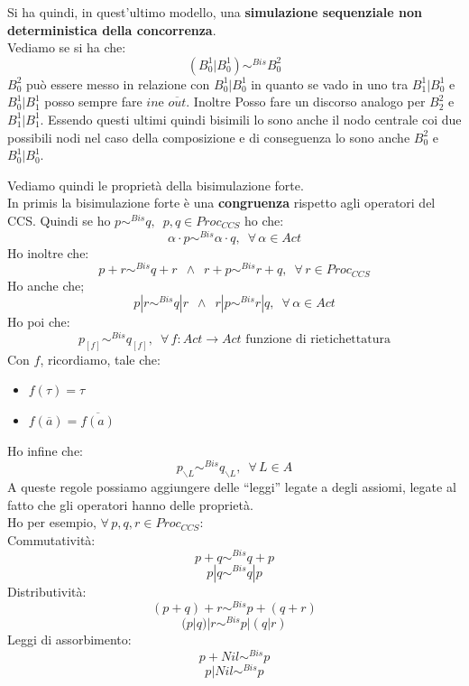 \documentclass[a4paper,12pt, oneside]{book}
\begin{document}
\begin{esempio}
\begin{center}
  \end{center}
  Si ha quindi, in quest'ultimo modello, una \textbf{simulazione sequenziale non
    deterministica della concorrenza}.\\
  Vediamo se si ha che:
  \[(B_0^1|B_0^1)\sim^{Bis}B_0^2\]
  $B_0^2$ può essere messo in relazione con $B_0^1|B_0^1$ in quanto se vado in
  uno tra $B_1^1|B_0^1$ e $B_0^1|B_1^1$ posso sempre fare $in $e
  $\overline{out}$. Inoltre Posso fare un discorso analogo per $B_2^2$ e
  $B_1^1|B_1^1$. Essendo questi ultimi quindi bisimili lo sono anche il nodo
  centrale coi due possibili nodi nel caso della composizione e di conseguenza
  lo sono anche $B_0^2$ e $B_0^1|B_0^1$.
\end{esempio}
Vediamo quindi le proprietà della bisimulazione forte.\\
In primis la bisimulazione forte è una \textbf{congruenza} rispetto agli
operatori del CCS. Quindi se ho $p\sim^{Bis}q,\,\,\,p,q\in Proc_{CCS}$ ho che:
\[\alpha\cdot p\sim^{Bis} \alpha\cdot q,\,\,\,\forall\,\alpha\in Act\]
Ho inoltre che:
\[p+r\sim^{Bis}q+r\,\,\,\land\,\,\,
  r+p\sim^{Bis} r+q,\,\,\,\forall\,r\in Proc_{CCS}\]
Ho anche che;
\[p|r\sim^{Bis}q|r\,\,\,\land \,\,\,r|p\sim^{Bis}r|q,\,\,\,\forall\,\alpha\in
  Act\]
Ho poi che:
\[p_{[f]}\sim^{Bis}q_{[f]},\,\,\,\forall\, f:Act\to Act \mbox{ funzione di
    rietichettatura}\]
Con $f$, ricordiamo, tale che:
\begin{itemize}
  \item $f(\tau)=\tau$
  \item $f(\overline{a})=\overline{f(a)}$
\end{itemize}
Ho infine che:
\[p_{\backslash L}\sim^{Bis}q_{\backslash L},\,\,\,\forall\, L\in A\]
A queste regole possiamo aggiungere delle ``leggi'' legate a degli assiomi,
legate al fatto che gli operatori hanno delle proprietà.\\
Ho per esempio, $\forall\,p,q,r\in Proc_{CCS}$:\\
Commutatività:
\[p+q\sim^{Bis}q+p\]
\[p|q\sim^{Bis}q|p\]
Distributività:
\[(p+q)+r\sim^{Bis}p+(q+r)\]
\[(p|q)|r\sim^{Bis} p|(q|r)\]
Leggi di assorbimento:
\[p+Nil\sim^{Bis} p\]
\[p|Nil\sim^{Bis} p\]
\end{document}
